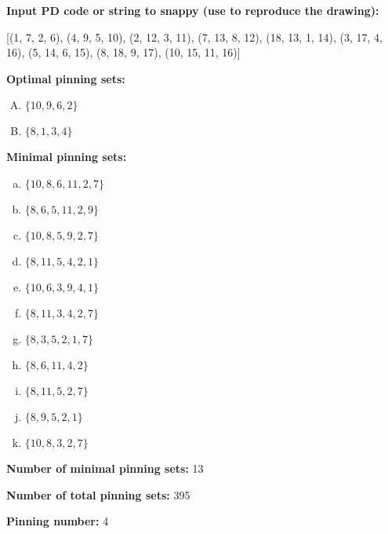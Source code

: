 \documentclass{article}%
\begin{document}
%
\small

\begin{multicols}{2}

\columnbreak

\noindent\textbf{Input PD code or string to snappy (use to reproduce the drawing):}

	[(1, 7, 2, 6), (4, 9, 5, 10), (2, 12, 3, 11), (7, 13, 8, 12), (18, 13, 1, 14), (3, 17, 4, 16), (5, 14, 6, 15), (8, 18, 9, 17), (10, 15, 11, 16)]

\noindent\textbf{Optimal pinning sets:}

\begin{enumerate}[A)]
\item{\Huge\textcolor{green0}{\textbullet}}$\{10,9,6,2\}$

\item{\Huge\textcolor{green1}{\textbullet}}$\{8,1,3,4\}$

\end{enumerate}
\textbf{Minimal pinning sets:}

\begin{enumerate}[a)]
\item{\Huge\textcolor{blue0}{\textbullet}}$\{10,8,6,11,2,7\}$

\item{\Huge\textcolor{blue1}{\textbullet}}$\{8,6,5,11,2,9\}$

\item{\Huge\textcolor{blue2}{\textbullet}}$\{10,8,5,9,2,7\}$

\item{\Huge\textcolor{blue3}{\textbullet}}$\{8,11,5,4,2,1\}$

\item{\Huge\textcolor{blue4}{\textbullet}}$\{10,6,3,9,4,1\}$

\item{\Huge\textcolor{blue5}{\textbullet}}$\{8,11,3,4,2,7\}$

\item{\Huge\textcolor{blue6}{\textbullet}}$\{8,3,5,2,1,7\}$

\item{\Huge\textcolor{blue7}{\textbullet}}$\{8,6,11,4,2\}$

\item{\Huge\textcolor{blue8}{\textbullet}}$\{8,11,5,2,7\}$

\item{\Huge\textcolor{blue9}{\textbullet}}$\{8,9,5,2,1\}$

\item{\Huge\textcolor{blue10}{\textbullet}}$\{10,8,3,2,7\}$

\end{enumerate}


\noindent\textbf{Number of minimal pinning sets:} 13

\noindent\textbf{Number of total pinning sets:} 395

\noindent\textbf{Pinning number:} 4


\end{multicols}
\end{document}
